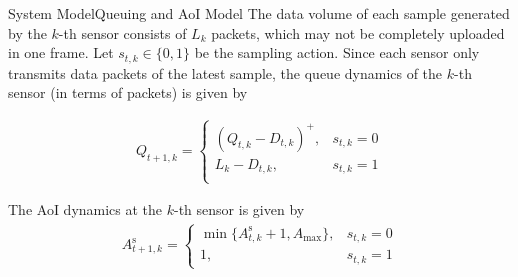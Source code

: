\documentclass[aspectratio=169]{beamer}
\begin{document}
\begin{frame}{System Model}{Queuing and AoI Model}
    \footnotesize
    The data volume of each sample generated by the $k$-th sensor consists of $L_{k}$ packets, which may not be completely uploaded in one frame. Let $s_{t,k}\!\in\!\{0,1\}$ be the sampling action. 
    Since each sensor only transmits data packets of the latest sample, the queue dynamics of the $k$-th sensor (in terms of packets) is given by
    \begin{minipage}[t]{0.55\linewidth}
        \vspace{-10pt}
        \begin{align*}
            Q_{t+1,k}=
            \begin{cases}
                (Q_{t,k}\!-\!D_{t,k})^{+}, & s_{t,k}=0 \\
                L_{k}-D_{t,k},         & s_{t,k}=1 \\
            \end{cases}
        \end{align*}
        
        The AoI dynamics at the $k$-th sensor is given by
        \begin{align*}
            A_{t+1,k}^{\mathrm{s}}
            \!=\!
            \begin{cases}
                \min\{A_{t,k}^{\mathrm{s}}+1,A_{\mathrm{max}}\}, & s_{t,k}=0 \\
                1,                                               & s_{t,k}=1
            \end{cases}
        \end{align*}


\end{minipage}
\end{frame}
\end{document}
